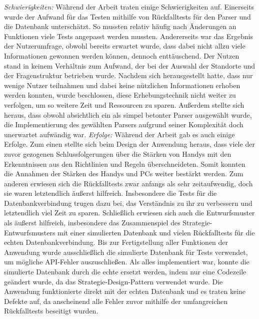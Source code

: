 \myNewSection
\textit{Schwierigkeiten:}
Während der Arbeit traten einige Schwierigkeiten auf.
	Einerseits wurde der Aufwand für das Testen mithilfe von Rückfalltests für den Parser und die Datenbank unterschätzt. So mussten relativ häufig nach Änderungen an Funktionen viele Tests angepasst werden mussten.
	Andererseits war das Ergebnis der Nutzerumfrage, obwohl bereits erwartet wurde, dass dabei nicht allzu viele Informationen gewonnen werden können, dennoch enttäuschend. Der Nutzen stand in keinem Verhältnis zum Aufwand, der bei der Auswahl der Standorte und der Fragenstruktur betrieben wurde. Nachdem sich herausgestellt hatte, dass nur wenige Nutzer teilnahmen und dabei keine nützlichen Informationen erhoben werden konnten, wurde beschlossen, diese Erhebungstechnik nicht weiter zu verfolgen, um so weitere Zeit und Ressourcen zu sparen.
	Außerdem stellte sich heraus, dass obwohl absichtlich ein als \glqq simpel\grqq{} betonter Parser ausgewählt wurde, die Implementierung des gewählten Parsers aufgrund seiner Komplexität doch unerwartet aufwändig war.
\newline%
\myNewSection
\textit{Erfolge:}
Während der Arbeit gab es auch einige Erfolge.
	Zum einen stellte sich beim Design der Anwendung heraus, dass viele der zuvor gezogenen Schlussfolgerungen über die Stärken von Handys mit den Erkenntnissen aus den Richtlinien und Regeln überschneideten. Somit konnten die Annahmen der Stärken des Handys und PCs weiter bestärkt werden.
	Zum anderen erwiesen sich die Rückfalltests zwar anfangs als sehr zeitaufwendig, doch sie waren letztendlich äußerst hilfreich. Insbesondere die Tests für die Datenbankverbindung trugen dazu bei, das Verständnis zu ihr zu verbessern und letztendlich viel Zeit zu sparen.
	Schließlich erwiesen sich auch die Entwurfsmuster als äußerst hilfreich, insbesondere das Zusammenspiel des Strategie-Entwurfsmusters mit einer simulierten Datenbank und vielen Rückfalltests für die echten Datenbankverbindung. Bis zur Fertigstellung aller Funktionen der Anwendung wurde ausschließlich die simulierte Datenbank für Tests verwendet, um mögliche API-Fehler auszuschließen. Als alles implementiert war, konnte die simulierte Datenbank durch die echte ersetzt werden, indem nur eine Codezeile geändert wurde, da das Strategie-Design-Pattern verwendet wurde. Die Anwendung funktionierte direkt mit der echten Datenbank und es traten keine Defekte auf, da anscheinend alle Fehler zuvor mithilfe der umfangreichen Rückfalltests beseitigt wurden.
\newline%
